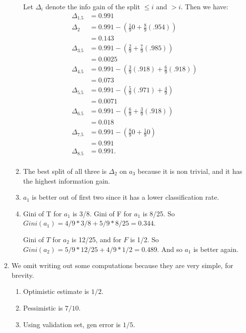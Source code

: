 \documentclass[12pt,oneside,reqno]{amsart}
\theoremstyle{plain}
\theoremstyle{definition}
\theoremstyle{remark}
\newcommand{\bee}{\begin{equation}\begin{aligned}}
\newcommand{\eee}{\end{aligned}\end{equation}}
\newcommand{\fracc}{\frac}
\newcommand{\lpar}{\left(}
\newcommand{\rpar}{\right)}
\begin{document}
\begin{enumerate}[label=\arabic*.]
\begin{enumerate}
Let $\Delta_i$ denote the info gain of the split $\leq i$ and $>i$. 
Then we have:
\bee
\Delta_{1.5} 
&= 0.991\\
\Delta_2 &= 0.991 - \lpar \fracc{1}{9}0 + \fracc{8}{9}(.954) \rpar\\
&= 0.143\\
\Delta_{3.5} &= 0.991 - \lpar \fracc{2}{9} + \fracc{7}{9}(.985) \rpar\\
&= 0.0025\\
\Delta_{4.5} &= 0.991 - \lpar \fracc{3}{9}(.918) + \fracc{6}{9}(.918) \rpar\\
&= 0.073\\
\Delta_{5.5} &= 0.991 - \lpar \fracc{5}{9}(.971) + \fracc{4}{9} \rpar\\
&= 0.0071\\
\Delta_{6.5} &= 0.991 - \lpar \fracc{6}{9} + \fracc{3}{9}(.918) \rpar\\
&= 0.018\\
\Delta_{7.5} &= 0.991 - \lpar \fracc{8}{9}0 + \fracc{1}{9}0 \rpar\\
&= 0.991\\
\Delta_{8.5} 
&= 0.991.\\
\eee

\item 
The best split of all three is $\Delta_2$ on $a_3$ because it is non trivial, and it has the highest information gain. 

\item $a_1$ is better out of first two since it has a lower classification rate. 

\item Gini of T for $a_1$ is 3/8. Gini of F for $a_1$ is 8/25. So $Gini(a_1) = 4/9 * 3/8 + 5/9 * 8/25 = 0.344$. 

Gini of $T$ for $a_2$ is 12/25, and for $F$ is 1/2. So $Gini(a_2) = 5/9 * 12/25 + 4/9 * 1/2 = 0.489$. And so $a_1$ is better again. 
\end{enumerate}

\setcounter{enumi}{7}
\item We omit writing out some computations because they are very simple, for brevity. 
\begin{enumerate}
\item Optimistic estimate is $1/2$. 
\item Pessimistic is $7/10$. 
\item Using validation set, gen error is $1/5$. 
\end{enumerate}



\end{enumerate}
\end{document}
